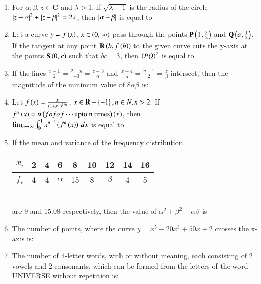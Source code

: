 \documentclass[journal]{IEEEtran}
\numberwithin{equation}{enumi}
\numberwithin{figure}{enumi}
\begin{document}
\begin{enumerate}[start=16]
    \item For $\alpha,\beta,z\in\mathbf{C}$ and $\lambda>1$, if $\sqrt{\lambda-1}$ is the radius of the circle $\left\vert z-\alpha\right\vert^2+\left\vert z-\beta\right\vert^2=2\lambda$, then $\left\vert\alpha-\beta\right\vert$ is equal to

    \item Let a curve $y = f\left(x\right)$,  $x\in\left(0,\infty\right)$ pass through the points $\mathbf{P}\left(1,\frac{3}{2}\right)$ and $\mathbf{Q}\left(a,\frac{1}{2}\right)$. If the tangent at any point $\mathbf{R}\left(b,f\left(b\right)\right)$ to the given curve cuts the y-axis at the points $\mathbf{S}\left(0,c\right)$ such that $bc=3$, then $\left(PQ\right)^2$ is equal to

    \item If the lines $\frac{x-1}{2} = \frac{2 - y}{-3} = \frac{z - 3}{\alpha}$ and $\frac{x - 4}{5} = \frac{y - 1}{2} = \frac{z}{\beta}$ intersect, then the magnitude of the minimum value of $8 \alpha \beta$ is:

    \item Let $f\left(x\right)=\frac{x}{\left(1+x^{n}\right)^{1/n}}$, $x\in\mathbf{R}-\left\{-1\right\},n\in N,n>2.$ If $f^n\left(x\right)=n\left(fofof\cdots \text{upto n times}\right)\left(x\right)$, then\\
    $\lim_{n\to\infty}\int_{0}^{1} x^{n-2}\left(f^n\left(x\right)\right) \,dx$ is equal to

    \item If the mean and variance of the frequency distribution. \\
    \begin{tabular}{|c|c|c|c|c|c|c|c|c|} 
        \hline
            $x_i$ & 2 & 4 & 6 & 8 & 10 & 12 & 14 & 16 \\ 
        \hline
            $f_i$ & 4 & 4 & $\alpha$ & 15 & 8 & $\beta$ & 4 & 5 \\ 
        \hline
    \end{tabular}\\
    are 9 and 15.08 respectively, then the  value of $\alpha^2+\beta^2-\alpha\beta$ is

    \item The number of points, where the curve $y=x^{5}-20x^{3}+50x+2$ crosses the x-axis is:

    \item The number of 4-letter words, with or without meaning, each consisting of 2 vowels and 2 consonants, which can be formed from the letters of the word UNIVERSE without repetition is: 


\end{enumerate}
\end{document}
